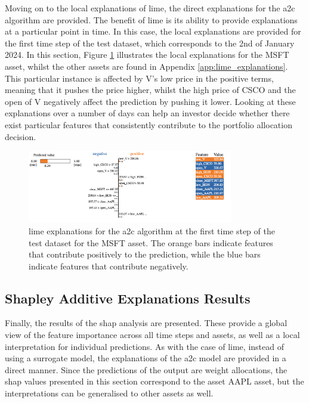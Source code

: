 Moving on to the local explanations of \acrshort{lime}, the direct explanations for the \acrshort{a2c} algorithm are provided. The benefit of \acrshort{lime} is its ability to provide explanations at a particular point in time. In this case, the local explanations are provided for the first time step of the test dataset, which corresponds to the 2nd of January 2024. In this section, Figure \ref{fig:a2c_lime_msft} illustrates the local explanations for the MSFT asset, whilst the other assets are found in Appendix \ref{app:lime_explanations}. This particular instance is affected by V's low price in the positive terms, meaning that it pushes the price higher, whilst the high price of CSCO and the open of V negatively affect the prediction by pushing it lower. Looking at these explanations over a number of days can help an investor decide whether there exist particular features that consistently contribute to the portfolio allocation decision.

\begin{figure}
    \centering
    \includegraphics[width=0.8\textwidth]{figures/a2c_lime_msft.png}
    \caption{\acrshort{lime} explanations for the \acrshort{a2c} algorithm at the first time step of the test dataset for the MSFT asset. The orange bars indicate features that contribute positively to the prediction, while the blue bars indicate features that contribute negatively.}
    \label{fig:a2c_lime_msft}
\end{figure}

\subsection{Shapley Additive Explanations Results} \label{sec:shap-results}

Finally, the results of the \acrshort{shap} analysis are presented. These provide a global view of the feature importance across all time steps and assets, as well as a local interpretation for individual predictions. As with the case of \acrshort{lime}, instead of using a surrogate model, the explanations of the \acrshort{a2c} model are provided in a direct manner. Since the predictions of the output are weight allocations, the \acrshort{shap} values presented in this section correspond to the asset AAPL asset, but the interpretations can be generalised to other assets as well. 

